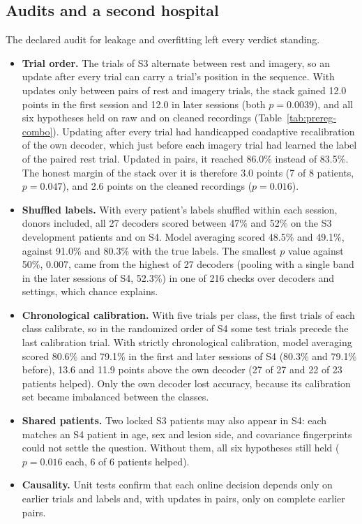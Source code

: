 \documentclass{ieeeaccess}
\begin{document}
\subsection{Audits and a second hospital}\label{sec:res-audit}

The declared audit for leakage and overfitting left every verdict standing.
\begin{itemize}
\item \textbf{Trial order.} The trials of S3 alternate between rest and imagery, so an update after every trial can carry a trial's position in the sequence. With updates only between pairs of rest and imagery trials, the stack gained 12.0 points in the first session and 12.0 in later sessions (both $p = 0.0039$), and all six hypotheses held on raw and on cleaned recordings (Table~\ref{tab:prereg-combo}). Updating after every trial had handicapped coadaptive recalibration of the own decoder, which just before each imagery trial had learned the label of the paired rest trial. Updated in pairs, it reached 86.0\% instead of 83.5\%. The honest margin of the stack over it is therefore 3.0 points (7 of 8 patients, $p = 0.047$), and 2.6 points on the cleaned recordings ($p = 0.016$).
\item \textbf{Shuffled labels.} With every patient's labels shuffled within each session, donors included, all 27 decoders scored between 47\% and 52\% on the S3 development patients and on S4. Model averaging scored 48.5\% and 49.1\%, against 91.0\% and 80.3\% with the true labels. The smallest $p$ value against 50\%, 0.007, came from the highest of 27 decoders (pooling with a single band in the later sessions of S4, 52.3\%) in one of 216 checks over decoders and settings, which chance explains.
\item \textbf{Chronological calibration.} With five trials per class, the first trials of each class calibrate, so in the randomized order of S4 some test trials precede the last calibration trial. With strictly chronological calibration, model averaging scored 80.6\% and 79.1\% in the first and later sessions of S4 (80.3\% and 79.1\% before), 13.6 and 11.9 points above the own decoder (27 of 27 and 22 of 23 patients helped). Only the own decoder lost accuracy, because its calibration set became imbalanced between the classes.
\item \textbf{Shared patients.} Two locked S3 patients may also appear in S4: each matches an S4 patient in age, sex and lesion side, and covariance fingerprints could not settle the question. Without them, all six hypotheses still held ($p = 0.016$ each, 6 of 6 patients helped).
\item \textbf{Causality.} Unit tests confirm that each online decision depends only on earlier trials and labels and, with updates in pairs, only on complete earlier pairs.
\end{itemize}
\end{document}
